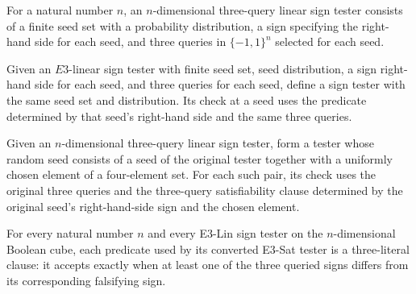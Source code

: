 \begin{definition}
\label{FABL.E3LinSignTester}
\leanok
{}
For a natural number $n$, an $n$-dimensional three-query linear sign tester consists of
a finite seed set with a probability distribution, a sign specifying the right-hand side
for each seed, and three queries in $\{−1,1\}^n$ selected for each seed.
\end{definition}

\begin{definition}
\label{FABL.E3LinSignTester.toSignTester}
\leanok
{}
Given an $E3$-linear sign tester with finite seed set, seed distribution, a sign
right-hand side for each seed, and three queries for each seed, define a sign tester
with the same seed set and distribution. Its check at a seed uses the predicate
determined by that seed's right-hand side and the same three queries.
\end{definition}

\begin{definition}
\label{FABL.E3LinSignTester.toE3SatTester}
\leanok
{}
Given an $n$-dimensional three-query linear sign tester, form a tester whose random seed
consists of a seed of the original tester together with a uniformly chosen element of a
four-element set. For each such pair, its check uses the original three queries and the
three-query satisfiability clause determined by the original seed’s right-hand-side sign
and the chosen element.
\end{definition}

\begin{theorem}
\label{FABL.E3LinSignTester.toE3SatTester_usesMaxE3Sat}
\leanok
{}
For every natural number $n$ and every E3-Lin sign tester on the $n$-dimensional Boolean
cube, each predicate used by its converted E3-Sat tester is a three-literal clause: it
accepts exactly when at least one of the three queried signs differs from its
corresponding falsifying sign.
\end{theorem}

